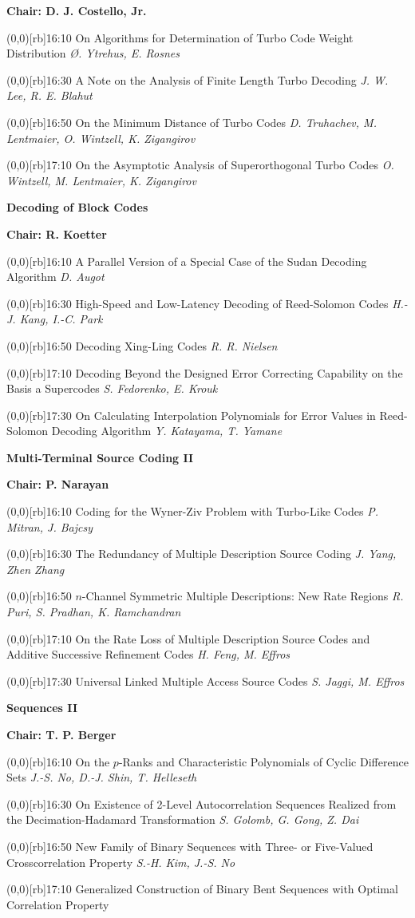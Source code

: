 \documentclass[a5paper,twoside]{article}
\def\sesstitle#1{\vspace{.45\bigskipamount}\par{\bfseries #1}\par}
\def\sesschair#1{{\bfseries Chair: #1}\par\vspace{.65\medskipamount}}
\def\papertime#1{\makebox(0,0)[rb]{{\scriptsize #1}\hspace{.5em}}}
\def\papertitle#1{#1\hfil\break}
\def\paperauthors#1{{\itshape #1}\par\filbreak\vspace{.65\medskipamount}}
\begin{document}
\sesschair{D. J. Costello, Jr.}
\papertime{16:10}%
\papertitle{On Algorithms for Determination of Turbo Code Weight Distribution}
\paperauthors{{\O}. Ytrehus, E. Rosnes}
\papertime{16:30}%
\papertitle{A Note on the Analysis of Finite Length Turbo Decoding}
\paperauthors{J. W. Lee, R. E. Blahut}
\papertime{16:50}%
\papertitle{On the Minimum Distance of Turbo Codes}
\paperauthors{D. Truhachev, M. Lentmaier, O. Wintzell, K. Zigangirov}
\papertime{17:10}%
\papertitle{On the Asymptotic Analysis of Superorthogonal Turbo Codes}
\paperauthors{O. Wintzell, M. Lentmaier, K. Zigangirov}
\sesstitle{Decoding of Block Codes}
\sesschair{R. Koetter}
\papertime{16:10}%
\papertitle{A Parallel Version of a Special Case of the Sudan Decoding Algorithm}
\paperauthors{D. Augot}
\papertime{16:30}%
\papertitle{High-Speed and Low-Latency Decoding of Reed-Solomon Codes}
\paperauthors{H.-J. Kang, I.-C. Park}
\papertime{16:50}%
\papertitle{Decoding Xing-Ling Codes}
\paperauthors{R. R. Nielsen}
\papertime{17:10}%
\papertitle{Decoding Beyond the Designed Error Correcting Capability on the Basis a Supercodes}
\paperauthors{S. Fedorenko, E. Krouk}
\papertime{17:30}%
\papertitle{On Calculating Interpolation Polynomials for Error Values in Reed-Solomon Decoding Algorithm}
\paperauthors{Y. Katayama, T. Yamane}
\sesstitle{Multi-Terminal Source Coding II}
\sesschair{P. Narayan}
\papertime{16:10}%
\papertitle{Coding for the Wyner-Ziv Problem with Turbo-Like Codes}
\paperauthors{P. Mitran, J. Bajcsy}
\papertime{16:30}%
\papertitle{The Redundancy of Multiple Description Source Coding}
\paperauthors{J. Yang, Zhen Zhang}
\papertime{16:50}%
\papertitle{$n$-Channel Symmetric Multiple Descriptions: New Rate Regions}
\paperauthors{R. Puri, S. Pradhan, K. Ramchandran}
\papertime{17:10}%
\papertitle{On the Rate Loss of Multiple Description Source Codes and Additive Successive Refinement Codes}
\paperauthors{H. Feng, M. Effros}
\papertime{17:30}%
\papertitle{Universal Linked Multiple Access Source Codes}
\paperauthors{S. Jaggi, M. Effros}
\sesstitle{Sequences II}
\sesschair{T. P. Berger}
\papertime{16:10}%
\papertitle{On the $p$-Ranks and Characteristic Polynomials of Cyclic Difference Sets}
\paperauthors{J.-S. No, D.-J. Shin, T. Helleseth}
\papertime{16:30}%
\papertitle{On Existence of 2-Level Autocorrelation Sequences Realized from the Decimation-Hadamard Transformation}
\paperauthors{S. Golomb, G. Gong, Z. Dai}
\papertime{16:50}%
\papertitle{New Family of Binary Sequences with Three- or Five-Valued Crosscorrelation Property}
\paperauthors{S.-H. Kim, J.-S. No}
\papertime{17:10}%
\papertitle{Generalized Construction of Binary Bent Sequences with Optimal Correlation Property}
\end{document}
